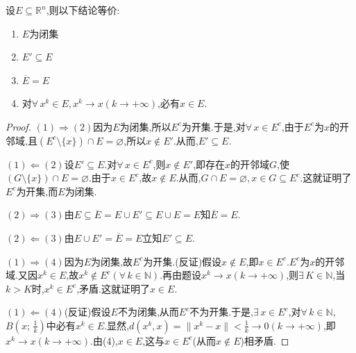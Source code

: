 \documentclass[../../main.tex]{subfiles}%
\begin{document}
\begin{theorem}\label{theorem:Rn中闭集的充要条件}
设$E\subseteq\mathbb{R}^n$,则以下结论等价:
\begin{enumerate}[(1)]
\item $E$为闭集

\item\label{theorem:Rn中闭集的充要条件-2} $E'\subseteq E$

\item $\overline{E}=E$

\item\label{theorem:Rn中闭集的充要条件-4} 对$\forall\,x^k\in E,x^k\to x(k\to+\infty)$,必有$x\in E$.
\end{enumerate}
\end{theorem}
\begin{proof}

$(1)\Rightarrow(2)$因为$E$为闭集,所以$E^c$为开集.于是,对$\forall\,x\in E^c$,由于$E^c$为$x$的开邻域,且$(E^c\setminus\{x\})\cap E=\varnothing$,所以$x\notin E'$.从而,$E'\subseteq E$.

$(1)\Leftarrow(2)$设$E'\subseteq E$.对$\forall\,x\in E^c$,则$x\notin E'$,即存在$x$的开邻域$G$,使$(G\setminus\{x\})\cap E=\varnothing$.由于$x\in E^c$,故$x\notin E$.从而,$G\cap E=\varnothing,x\in G\subseteq E^c$.这就证明了$E^c$为开集,而$E$为闭集.

$(2)\Rightarrow(3)$由$E\subseteq\overline{E}=E\cup E'\subseteq E\cup E=E$知$\overline{E}=E$.

$(2)\Leftarrow(3)$由$E\cup E'=\overline{E}=E$立知$E'\subseteq E$.

$(1)\Rightarrow(4)$因为$E$为闭集,故$E^c$为开集.(反证)假设$x\notin E$,即$x\in E^c$.$E^c$为$x$的开邻域.又因$x^k\in E$,故$x^k\notin E^c(\forall\,k\in\mathbb{N})$.再由题设$x^k\to x(k\to+\infty)$,则$\exists\,K\in\mathbb{N}$,当$k>K$时,$x^k\in E^c$,矛盾.这就证明了$x\in E$.

$(1)\Leftarrow(4)$(反证)假设$E$不为闭集,从而$E^c$不为开集.于是,$\exists\,x\in E^c$,对$\forall\,k\in\mathbb{N}$,$B\left(x;\,\frac{1}{k}\right)$中必有$x^k\in E$.显然,$d(x^k,x)=\|x^k-x\|<\frac{1}{k}\to0(k\to+\infty)$,即$x^k\to x(k\to+\infty)$.由(4),$x\in E$,这与$x\in E^c$(从而$x\notin E$)相矛盾.

\end{proof}
\end{document}

